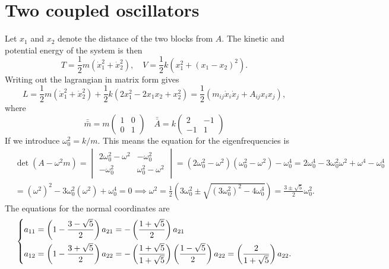 \documentclass{article}
\begin{document}
    \section{Two coupled oscillators}
        Let $x_1$ and $x_2$ denote the distance of the two blocks from $A$. The kinetic and potential energy of the system is then
        \begin{equation*}
            T = \frac{1}{2}m(\dot x_1^2 + \dot x_2^2), \quad V = \frac{1}{2} k (x_1^2 + (x_1 - x_2)^2).
        \end{equation*}
        Writing out the lagrangian in matrix form gives
        \begin{equation*}
            L = \frac{1}{2}m(\dot x_1^2 + \dot x_2^2) + \frac{1}{2}k (2  x_1^2 - 2 x_1  x_2 + x_2^2) = \frac{1}{2}\left(m_{ij}\dot x_i \dot x_j + A_{ij} x_i x_j\right),
        \end{equation*}
        where
        \begin{equation*}
            \bar {\bar m} = m
            \begin{pmatrix}
                1 & 0 \\
                0 & 1 
            \end{pmatrix}
            \quad \bar {\bar A} = k
            \begin{pmatrix*}
                2 & -1 \\
                -1 & 1
            \end{pmatrix*}
        \end{equation*}
        If we introduce $\omega_0^2 = k/m$. This means the equation for the eigenfrequencies is
        \begin{align*} & \det(A - \omega^2m) = 
            \begin{vmatrix}
                2\omega_0^2 - \omega^2& -\omega_0^2 \\
                -\omega_0^2 & \omega_0^2 - \omega^2
            \end{vmatrix}
            = (2\omega_0^2 - \omega^2)(\omega_0^2 - \omega^2) - \omega_0^4 = 2\omega_0^4 - 3 \omega_0^2\omega^2 + \omega^4 - \omega_0^4 \\
            & = (\omega^2)^2 - 3\omega_0^2(\omega^2) + \omega_0^4 =0 \implies \omega^2 = \frac{1}{2} \left(3\omega_0^2 \pm \sqrt{(3\omega_0^2)^2 - 4\omega_0^4}\right) = \frac{3 \pm \sqrt{5}}{2}\omega_0^2.
        \end{align*}
        The equations for the normal coordinates are
        \begin{equation*}
            \begin{dcases*}
                a_{11} = \left(1 - \frac{3 - \sqrt{5}}{2}\right)a_{21} =-\left(\frac{1 + \sqrt{5}}{2}\right)a_{21}\\
                a_{12} = \left(1 - \frac{3 + \sqrt{5}}{2}\right)a_{22} = -\left(\frac{1+\sqrt5}{1+\sqrt 5}\right)\left(\frac{1 - \sqrt{5}}{2}\right)a_{22} = \left(\frac{2}{1 + \sqrt 5}\right) a_{22}.
            \end{dcases*}
        \end{equation*}
\end{document}
